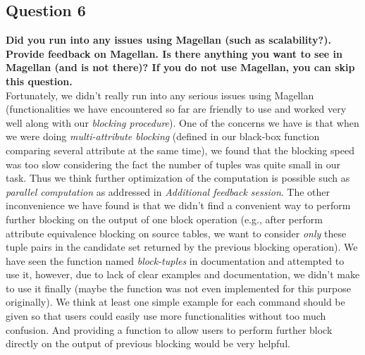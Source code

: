\documentclass[10pt, oneside]{article}
\begin{document}
\subsection*{Question 6}
\textbf{Did you run into any issues using Magellan (such as scalability?). Provide feedback on Magellan. Is there anything you want to see in Magellan (and is not there)?  If you do not use Magellan, you can skip this question.}
\vspace{1ex}
\\
Fortunately, we didn't really run into any serious issues using Magellan (functionalities we have encountered so far are friendly to use and worked very well along with our \textit{blocking procedure}). One of the concerns we have
is that when we were doing \textit{multi-attribute blocking} (defined in our black-box function comparing several attribute at the same time), we found that the blocking speed was too slow considering
the fact the number of tuples was quite small in our task. Thus we think further optimization of the computation is possible such as \textit{parallel computation} as addressed in \textit{Additional feedback session}. The other
inconvenience we have found is that we didn't find a convenient way to perform further blocking on the output of one block operation (e.g., after perform attribute equivalence blocking on source tables, we want to consider \textit{only}
these tuple pairs in the candidate set returned by the previous blocking operation). We have seen the function named \textit{block-tuples} in documentation and attempted to use it, however, due to lack of clear examples and documentation, we didn't make to use it finally (maybe the function was not even implemented for this purpose originally). We think at least one simple example for each command should be given so that users could easily use more functionalities without too much confusion. And providing a function to allow users to perform further block directly on the output of previous blocking would be very helpful.
\end{document}
